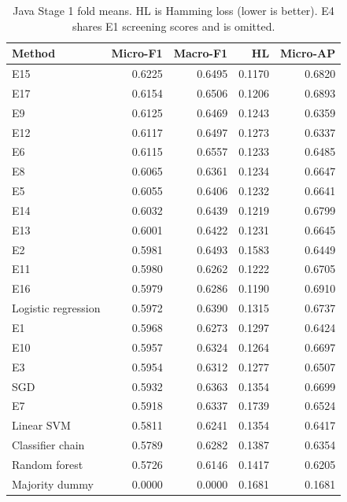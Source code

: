 \begin{table}[htbp]
\centering\small
\caption{Java Stage 1 fold means. HL is Hamming loss (lower is better). E4 shares E1 screening scores and is omitted.}\label{tab:javacv}
\begin{tabular}{lrrrr}\toprule
Method & Micro-F1 & Macro-F1 & HL & Micro-AP\\\midrule
E15 & 0.6225 & 0.6495 & 0.1170 & 0.6820\\
E17 & 0.6154 & 0.6506 & 0.1206 & 0.6893\\
E9 & 0.6125 & 0.6469 & 0.1243 & 0.6359\\
E12 & 0.6117 & 0.6497 & 0.1273 & 0.6337\\
E6 & 0.6115 & 0.6557 & 0.1233 & 0.6485\\
E8 & 0.6065 & 0.6361 & 0.1234 & 0.6647\\
E5 & 0.6055 & 0.6406 & 0.1232 & 0.6641\\
E14 & 0.6032 & 0.6439 & 0.1219 & 0.6799\\
E13 & 0.6001 & 0.6422 & 0.1231 & 0.6645\\
E2 & 0.5981 & 0.6493 & 0.1583 & 0.6449\\
E11 & 0.5980 & 0.6262 & 0.1222 & 0.6705\\
E16 & 0.5979 & 0.6286 & 0.1190 & 0.6910\\
Logistic regression & 0.5972 & 0.6390 & 0.1315 & 0.6737\\
E1 & 0.5968 & 0.6273 & 0.1297 & 0.6424\\
E10 & 0.5957 & 0.6324 & 0.1264 & 0.6697\\
E3 & 0.5954 & 0.6312 & 0.1277 & 0.6507\\
SGD & 0.5932 & 0.6363 & 0.1354 & 0.6699\\
E7 & 0.5918 & 0.6337 & 0.1739 & 0.6524\\
Linear SVM & 0.5811 & 0.6241 & 0.1354 & 0.6417\\
Classifier chain & 0.5789 & 0.6282 & 0.1387 & 0.6354\\
Random forest & 0.5726 & 0.6146 & 0.1417 & 0.6205\\
Majority dummy & 0.0000 & 0.0000 & 0.1681 & 0.1681\\
\bottomrule\end{tabular}
\end{table}
